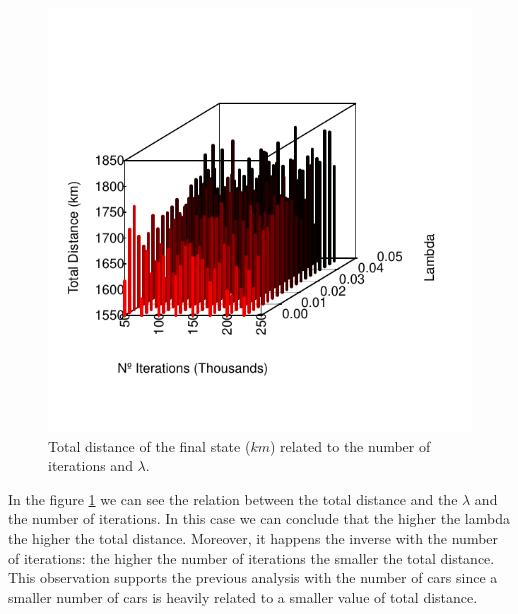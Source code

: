 \documentclass[12]{article}
\begin{document}
       \begin{figure}[H]
       \captionsetup{justification=centering}
       \centering
        \includegraphics[scale=0.9]{Results/data_B_3.pdf}
        \caption{Total distance of the final state ($km$) related to the number of iterations and $\lambda$.}
        \label{fig:data4}
    \end{figure}
      \vspace{1cm}
In the figure \ref{fig:data4} we can see the relation between the total distance and the $\lambda$ and the number of iterations. In this case we can conclude that the higher the lambda the higher the total distance. Moreover, it happens the inverse with the number of iterations: the higher the number of iterations the smaller the total distance. 
\\
This observation supports the previous analysis with the number of cars since a smaller number of cars is heavily related to a smaller value of total distance.
    
\end{document}
